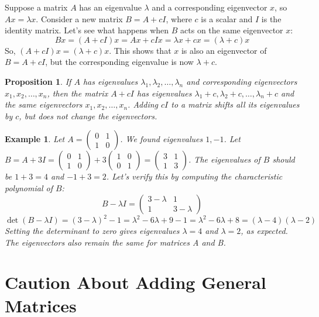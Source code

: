 \documentclass{article}
\newtheorem{proposition}[theorem]{Proposition}
\newtheorem{example}{Example}
\begin{document}
Suppose a matrix $A$ has an eigenvalue $\lambda$ and a corresponding eigenvector $x$, so $Ax = \lambda x$. Consider a new matrix $B = A + cI$, where $c$ is a scalar and $I$ is the identity matrix. Let's see what happens when $B$ acts on the same eigenvector $x$:
\[Bx = (A + cI)x = Ax + cIx = \lambda x + cx = (\lambda + c)x\]
So, $(A + cI)x = (\lambda + c)x$. This shows that $x$ is also an eigenvector of $B = A + cI$, but the corresponding eigenvalue is now $\lambda + c$.

\begin{proposition}
If $A$ has eigenvalues $\lambda_1, \lambda_2, \dots, \lambda_n$ and corresponding eigenvectors $x_1, x_2, \dots, x_n$, then the matrix $A + cI$ has eigenvalues $\lambda_1 + c, \lambda_2 + c, \dots, \lambda_n + c$ and the same eigenvectors $x_1, x_2, \dots, x_n$. Adding $cI$ to a matrix shifts all its eigenvalues by $c$, but does not change the eigenvectors.
\end{proposition}

\begin{example}
Let $A = \begin{pmatrix} 0 & 1 \\ 1 & 0 \end{pmatrix}$. We found eigenvalues $1, -1$.
Let $B = A + 3I = \begin{pmatrix} 0 & 1 \\ 1 & 0 \end{pmatrix} + 3\begin{pmatrix} 1 & 0 \\ 0 & 1 \end{pmatrix} = \begin{pmatrix} 3 & 1 \\ 1 & 3 \end{pmatrix}$.
The eigenvalues of $B$ should be $1+3=4$ and $-1+3=2$.
Let's verify this by computing the characteristic polynomial of $B$:
\[B - \lambda I = \begin{pmatrix} 3-\lambda & 1 \\ 1 & 3-\lambda \end{pmatrix}\]
\[\det(B - \lambda I) = (3-\lambda)^2 - 1 = \lambda^2 - 6\lambda + 9 - 1 = \lambda^2 - 6\lambda + 8 = (\lambda - 4)(\lambda - 2)\]
Setting the determinant to zero gives eigenvalues $\lambda = 4$ and $\lambda = 2$, as expected. The eigenvectors also remain the same for matrices A and B.
\end{example}


\section{Caution About Adding General Matrices}
\end{document}
